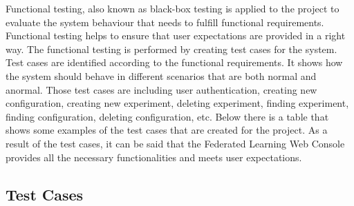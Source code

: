 Functional testing, also known as black-box testing is applied to the project to evaluate the system behaviour that needs to fulfill functional requirements.
Functional testing helps to ensure that user expectations are provided in a right way. The functional testing is performed by creating test cases for the system.\\

Test cases are identified according to the functional requirements. It shows how the system should behave in different scenarios that are both normal and anormal.
Those test cases are including user authentication, creating new configuration, creating new experiment, deleting experiment, finding experiment, finding configuration, deleting configuration, etc.
Below there is a table that shows some examples of the test cases that are created for the project. As a result of the test cases, it can be said that the Federated Learning Web Console provides all the
necessary functionalities and meets user expectations.

\subsection{Test Cases}



